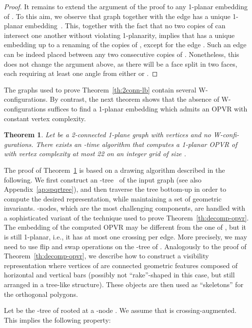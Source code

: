 \documentclass{article}
\newtheorem{theorem}{Theorem}
\newcommand{\opvr}{OPVR\xspace}
\begin{document}
\begin{proof}
It remains to extend the argument of the proof to any 1-planar embedding of . To this aim, we observe that graph  together with the edge   has a unique 1-planar embedding~\cite{Suzuki2010}. This, together with the fact that no two copies of  can intersect one another without violating 1-planarity, implies that  has a unique embedding up to a renaming of the  copies of , except for the edge . Such an edge can be indeed placed between any two consecutive copies of . Nonetheless, this does not change the argument above, as there will be a face  split in two faces, each requiring at least one  angle from either  or .
\end{proof}


The graphs used to prove Theorem~\ref{th:2conn-lb} contain several W-configurations. By contrast, the next theorem shows that the absence of W-configurations suffices to find a 1-planar embedding which admits an \opvr with constant vertex complexity. 

\begin{theorem}\label{th:2conn1plane-ub}
Let  be a 2-connected 1-plane graph with  vertices and no W-confi-gurations. There exists an -time algorithm that computes a 1-planar \opvr of  with vertex complexity at most 22 on an integer grid of size .
\end{theorem}

The proof of Theorem~\ref{th:2conn1plane-ub} is based on a drawing algorithm described in the following. We first construct an -tree~\cite{DBLP:journals/siamcomp/BattistaT96} of the input graph  (see also Appendix~\ref{ap:spqrtree}), and then traverse  the tree bottom-up in order to compute the desired representation, while maintaining a set of geometric invariants. -nodes, which are the most challenging components, are handled with a sophisticated variant of the technique used to prove Theorem~\ref{th:decomp-opvr}. The embedding of the computed \opvr may be different from the one of , but it is still 1-planar, i.e., it has at most one crossing per edge. More precisely, we may need to use flip and swap operations on the -tree of .  Analogously to  the proof of Theorem~\ref{th:decomp-opvr}, we describe how to construct a visibility representation where vertices of  are connected geometric features composed of horizontal and vertical bars (possibly not ``rake''-shaped in this case, but still arranged in a tree-like structure). These objects are then used as ``skeletons'' for the orthogonal polygons.


Let  be the -tree of  rooted at a -node . We assume that  is crossing-augmented. This implies the following property:
\end{document}
